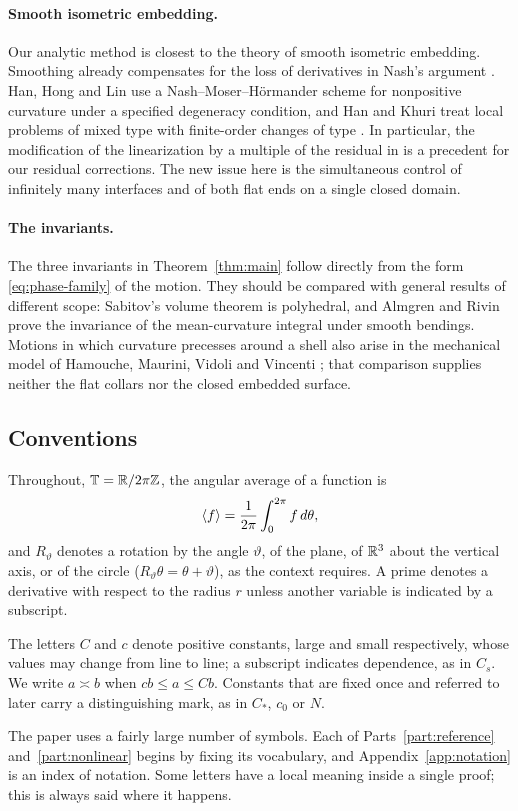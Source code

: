 \paragraph{Smooth isometric embedding.}
Our analytic method is closest to the theory of smooth isometric
embedding. Smoothing already compensates for the loss of derivatives in
Nash's argument \cite{Nash1956}. Han, Hong and Lin
\cite[Theorem~1.1]{HanHongLin2003} use a Nash--Moser--H\"ormander
scheme for nonpositive curvature under a specified degeneracy
condition, and Han and Khuri treat local problems of mixed type with
finite-order changes of type \cite{HanKhuri2010,HanKhuri2013}. In
particular, the modification of the linearization by a multiple of the
residual in \cite[pp.~650--653]{HanKhuri2010} is a precedent for our
residual corrections. The new issue here is the simultaneous control of
infinitely many interfaces and of both flat ends on a single closed
domain.

\paragraph{The invariants.}
The three invariants in Theorem~\ref{thm:main} follow directly from the
form \eqref{eq:phase-family} of the motion. They should be compared
with general results of different scope: Sabitov's volume theorem
\cite{Sabitov1996} is polyhedral, and Almgren and Rivin
\cite{AlmgrenRivin1998} prove the invariance of the mean-curvature
integral under smooth bendings. Motions in which curvature precesses
around a shell also arise in the mechanical model of Hamouche, Maurini,
Vidoli and Vincenti \cite{Hamouche2017}; that comparison supplies
neither the flat collars nor the closed embedded surface.

\subsection{Conventions}
\label{subsec:conventions}

Throughout, $\mathbb T=\mathbb R/2\pi\mathbb Z$, the angular average of a function is
\[
 \langle f\rangle=\frac1{2\pi}\int_0^{2\pi}f\,d\theta ,
\]
and $R_\vartheta$ denotes a rotation by the angle $\vartheta$, of the
plane, of $\mathbb R^3$ about the vertical axis, or of the circle
($R_\vartheta\theta=\theta+\vartheta$), as the context requires. A
prime denotes a derivative with respect to the radius $r$ unless
another variable is indicated by a subscript.

The letters $C$ and $c$ denote positive constants, large and small
respectively, whose values may change from line to line; a subscript
indicates dependence, as in $C_s$. We write $a\asymp b$ when
$cb\le a\le Cb$. Constants that are fixed once and referred to later
carry a distinguishing mark, as in $C_*$, $c_0$ or $N$.

The paper uses a fairly large number of symbols. Each of
Parts~\ref{part:reference} and~\ref{part:nonlinear} begins by fixing
its vocabulary, and Appendix~\ref{app:notation} is an index of
notation. Some letters have a local meaning inside a single proof;
this is always said where it happens.
